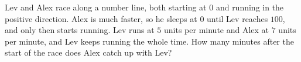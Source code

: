 Lev and Alex race along a number line, both starting at $0$ and running in the positive direction. Alex is much faster, so he sleeps at $0$ until Lev reaches $100$, and only then starts running. Lev runs at $5$ units per minute and Alex at $7$ units per minute, and Lev keeps running the whole time. How many minutes after the start of the race does Alex catch up with Lev?
